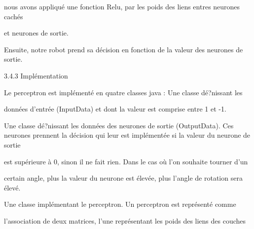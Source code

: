 \documentclass[a4paper,portrait,12pt]{article}
\begin{document}
\begin{flushleft}
nous avons appliqu\'{e} une fonction Relu, par les poids des liens entres neurones cach\'{e}s
\end{flushleft}


\begin{flushleft}
et neurones de sortie.
\end{flushleft}


\begin{flushleft}
Ensuite, notre robot prend sa d\'{e}cision en fonction de la valeur des neurones de sortie.
\end{flushleft}





\begin{flushleft}
3.4.3 Impl\'{e}mentation
\end{flushleft}


\begin{flushleft}
Le perceptron est impl\'{e}ment\'{e} en quatre classes java : Une classe d\'{e}?nissant les
\end{flushleft}


\begin{flushleft}
donn\'{e}es d'entr\'{e}e (InputData) et dont la valeur est comprise entre 1 et -1.
\end{flushleft}


\begin{flushleft}
Une classe d\'{e}?nissant les donn\'{e}es des neurones de sortie (OutputData). Ces neurones prennent la d\'{e}cision qui leur est impl\'{e}ment\'{e}e si la valeur du neurone de sortie
\end{flushleft}


\begin{flushleft}
est sup\'{e}rieure \`{a} 0, sinon il ne fait rien. Dans le cas où l'on souhaite tourner d'un
\end{flushleft}


\begin{flushleft}
certain angle, plus la valeur du neurone est \'{e}lev\'{e}e, plus l'angle de rotation sera \'{e}lev\'{e}.
\end{flushleft}


\begin{flushleft}
Une classe impl\'{e}mentant le perceptron. Un perceptron est repr\'{e}sent\'{e} comme
\end{flushleft}


\begin{flushleft}
l'association de deux matrices, l'une repr\'{e}sentant les poids des liens des couches
\end{flushleft}
\end{document}
